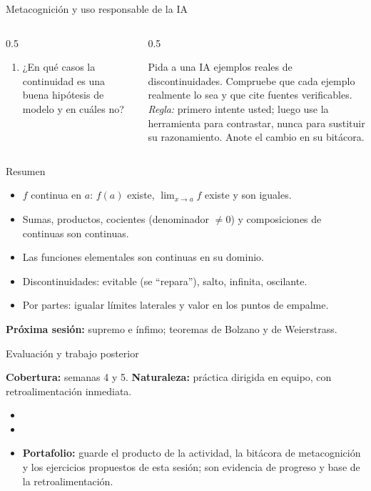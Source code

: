 \documentclass[10pt,aspectratio=169]{beamer}
\begin{document}
\begin{frame}{Metacognición y uso responsable de la IA}
  \small
  \begin{columns}[t]
    \begin{column}{0.5\textwidth}
      \begin{metacog}
        \begin{enumerate}
          \metacomun
          \item ¿En qué casos la continuidad es una buena hipótesis de modelo y en cuáles no?
        \end{enumerate}
      \end{metacog}
    \end{column}
    \begin{column}{0.5\textwidth}
      \begin{iabox}
        Pida a una IA ejemplos reales de discontinuidades. Compruebe que cada ejemplo realmente lo sea y que cite fuentes verificables.\\[2pt]
        \textit{Regla:} primero intente usted; luego use la herramienta para contrastar, nunca para sustituir su razonamiento. Anote el cambio en su bitácora.
      \end{iabox}
    \end{column}
  \end{columns}
\end{frame}

\begin{frame}{Resumen}
  \begin{itemize}
    \item $f$ continua en $a$: $f(a)$ existe, $\lim_{x\to a}f$ existe y son iguales.
    \item Sumas, productos, cocientes (denominador $\ne0$) y composiciones de continuas son continuas.
    \item Las funciones elementales son continuas en su dominio.
    \item Discontinuidades: evitable (se ``repara''), salto, infinita, oscilante.
    \item Por partes: igualar límites laterales y valor en los puntos de empalme.
  \end{itemize}
  \vspace{3mm}
  \textbf{Próxima sesión:} supremo e ínfimo; teoremas de Bolzano y de Weierstrass.
\end{frame}


\begin{frame}{Evaluación y trabajo posterior}
  \small
  \begin{evalbox}
    \textbf{Cobertura:} semanas 4 y 5. \textbf{Naturaleza:} práctica dirigida en equipo, con retroalimentación inmediata.
  \end{evalbox}
  \begin{itemize}
    \item \criterios
    \item \declaracionia
    \item \textbf{Portafolio:} guarde el producto de la actividad, la bitácora de metacognición y los ejercicios propuestos de esta sesión; son evidencia de progreso y base de la retroalimentación.
  \end{itemize}
\end{frame}
\end{document}
